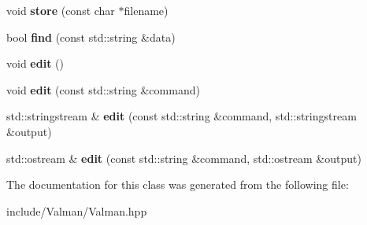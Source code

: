 \begin{DoxyCompactItemize}
\item 
\hypertarget{classttl_1_1_valman_aab7accd8bf3f7f2a91882f82cc916c3f}{void {\bfseries store} (const char $\ast$filename)}\label{classttl_1_1_valman_aab7accd8bf3f7f2a91882f82cc916c3f}

\item 
\hypertarget{classttl_1_1_valman_a75d3a81d06664d1759b1e7170b259a43}{bool {\bfseries find} (const std\-::string \&data)}\label{classttl_1_1_valman_a75d3a81d06664d1759b1e7170b259a43}

\item 
\hypertarget{classttl_1_1_valman_a4099a57f87bd220a24446f70041231be}{void {\bfseries edit} ()}\label{classttl_1_1_valman_a4099a57f87bd220a24446f70041231be}

\item 
\hypertarget{classttl_1_1_valman_aee9df8369fcad995d061b1928d1591d4}{void {\bfseries edit} (const std\-::string \&command)}\label{classttl_1_1_valman_aee9df8369fcad995d061b1928d1591d4}

\item 
\hypertarget{classttl_1_1_valman_aaef50349af0a4f80c7c47785e2e4bc5f}{std\-::stringstream \& {\bfseries edit} (const std\-::string \&command, std\-::stringstream \&output)}\label{classttl_1_1_valman_aaef50349af0a4f80c7c47785e2e4bc5f}

\item 
\hypertarget{classttl_1_1_valman_ae64b9d9140407189d74dcb9eada6c5b6}{std\-::ostream \& {\bfseries edit} (const std\-::string \&command, std\-::ostream \&output)}\label{classttl_1_1_valman_ae64b9d9140407189d74dcb9eada6c5b6}

\end{DoxyCompactItemize}


The documentation for this class was generated from the following file\-:\begin{DoxyCompactItemize}
\item 
include/\-Valman/Valman.\-hpp\end{DoxyCompactItemize}
